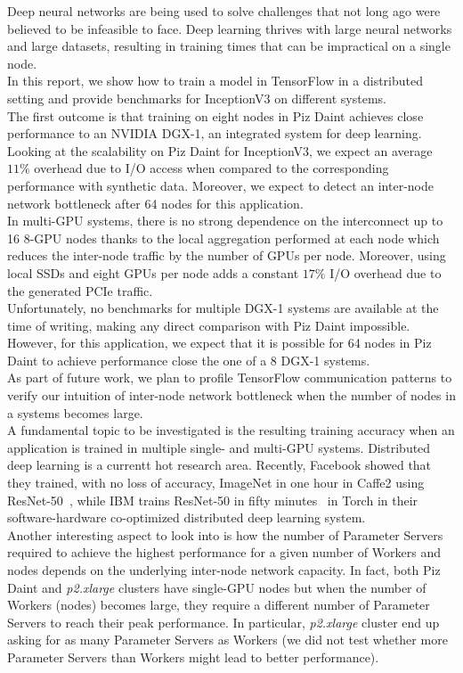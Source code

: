 Deep neural networks are being used to solve challenges that not long ago were believed to be infeasible to face.
Deep learning thrives with large neural networks and large datasets, resulting in training times that can be impractical on a single node.\\[-0.4cm]

In this report, we show how to train a model in TensorFlow in a distributed setting and provide benchmarks for InceptionV3 on different systems.\\
The first outcome is that training on eight nodes in Piz Daint achieves close performance to an NVIDIA DGX-1, an integrated system for deep learning.\\
Looking at the scalability on Piz Daint for InceptionV3, we expect an average $11\%$ overhead due to I/O access when compared to the corresponding performance with synthetic data.
Moreover, we expect to detect an inter-node network bottleneck after 64 nodes for this application.\\
In multi-GPU systems, there is no strong dependence on the interconnect up to 16 8-GPU nodes thanks to the local aggregation performed at each node which reduces the inter-node traffic by the number of GPUs per node.
Moreover, using local SSDs and eight GPUs per node adds a constant $17\%$ I/O overhead due to the generated PCIe traffic.\\
Unfortunately, no benchmarks for multiple DGX-1 systems are available at the time of writing, making any direct comparison with Piz Daint impossible.
However, for this application, we expect that it is possible for 64 nodes in Piz Daint to achieve performance close the one of a 8 DGX-1 systems.\\[-0.4cm]

As part of future work, we plan to profile TensorFlow communication patterns to verify our intuition of inter-node network bottleneck when the number of nodes in a systems becomes large.\\
A fundamental topic to be investigated is the resulting training accuracy when an application is trained in multiple single- and multi-GPU systems.
Distributed deep learning is a currentt hot research area. 
Recently, Facebook showed that they trained, with no loss of accuracy, ImageNet in one hour in Caffe2 using ResNet-50~\cite{fair}, while IBM trains ResNet-50 in fifty minutes~\cite{ibm} in Torch in their software-hardware co-optimized distributed deep learning system.\\
Another interesting aspect to look into is how the number of Parameter Servers required to achieve the highest performance for a given number of Workers and nodes depends on the underlying inter-node network capacity.
In fact, both Piz Daint and \textit{p2.xlarge} clusters have single-GPU nodes but when the number of Workers (nodes) becomes large, they require a different number of Parameter Servers to reach their peak performance.
In particular, \textit{p2.xlarge} cluster end up asking for as many Parameter Servers as Workers (we did not test whether more Parameter Servers than Workers might lead to better performance).